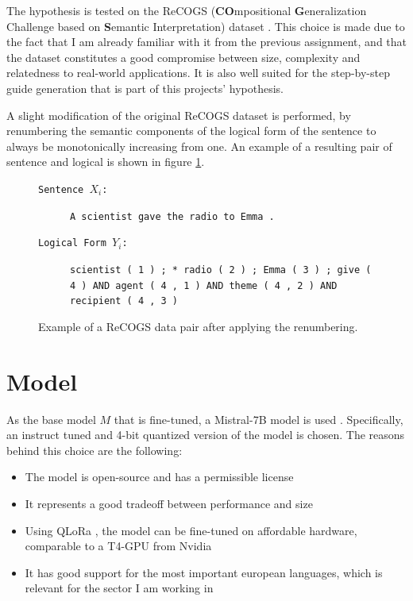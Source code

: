 \documentclass[11pt]{article}
\begin{document}
    The hypothesis is tested on the ReCOGS (\textbf{CO}mpositional \textbf{G}eneralization Challenge based on
    \textbf{S}emantic Interpretation) dataset \cite{wu_recogs_2024, kim_cogs_2020}.
    This choice is made due to the fact that I am already familiar with it from the previous assignment, and that the
    dataset constitutes a good compromise between size, complexity and relatedness to real-world applications.
    It is also well suited for the step-by-step guide generation that is part of this projects' hypothesis.

    A slight modification of the original ReCOGS dataset is performed, by renumbering the semantic components of the
    logical form of the sentence to always be monotonically increasing from one.
    An example of a resulting pair of sentence and logical is shown in figure \ref{fig:recogs_base}.

    \begin{figure}
        \small
        \begin{description}
            \item[\texttt{Sentence $X_i$:}] \texttt{A scientist gave the radio to Emma .}
            \item[\texttt{Logical Form $Y_i$:}] \texttt{scientist ( 1 ) ; * radio ( 2 ) ; Emma ( 3 ) ; give ( 4 ) AND agent ( 4 , 1 ) AND theme ( 4 , 2 ) AND recipient ( 4 , 3 )}
        \end{description}
        \caption{Example of a ReCOGS data pair after applying the renumbering.}
        \label{fig:recogs_base}
    \end{figure}


    \section{Model}
    As the base model $M$ that is fine-tuned, a Mistral-7B model is used \cite{jiang_mistral_2023}.
    Specifically, an instruct tuned and 4-bit quantized version of the model is chosen.
    The reasons behind this choice are the following:
    \begin{itemize}
        \item The model is open-source and has a permissible license
        \item It represents a good tradeoff between performance and size
        \item Using QLoRa \cite{dettmers_qlora_2023, hu_lora_2021}, the model can be fine-tuned on affordable hardware, comparable to a T4-GPU from Nvidia
        \item It has good support for the most important european languages, which is relevant for the sector I am working in
    \end{itemize}
\end{document}
